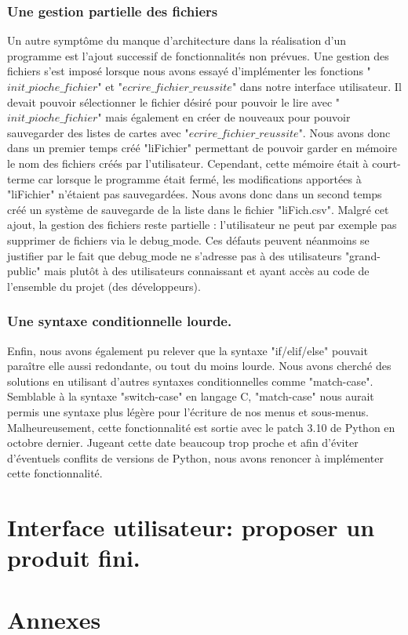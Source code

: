 \documentclass[10pt,a4paper,french,titlepage]{article}
\theoremstyle{definition}
\begin{document}
\subsubsection{Une gestion partielle des fichiers}
Un autre symptôme du manque d'architecture dans la réalisation d'un programme est l'ajout successif de fonctionnalités non prévues. Une gestion des fichiers s'est imposé lorsque nous avons essayé d'implémenter les fonctions "$init\_pioche\_fichier$" et "$ecrire\_fichier\_reussite$" dans notre interface utilisateur. Il devait pouvoir sélectionner le fichier désiré pour pouvoir le lire avec "$init\_pioche\_fichier$" mais également en créer de nouveaux pour pouvoir sauvegarder des listes de cartes avec "$ecrire\_fichier\_reussite$". Nous avons donc dans un premier temps créé "liFichier" permettant de pouvoir garder en mémoire le nom des fichiers créés par l'utilisateur. Cependant, cette mémoire était à court-terme car lorsque le programme était fermé, les modifications apportées à "liFichier" n'étaient pas sauvegardées. Nous avons donc dans un second temps créé un système de sauvegarde de la liste dans le fichier "liFich.csv". Malgré cet ajout, la gestion des fichiers reste partielle : l'utilisateur ne peut par exemple pas supprimer de fichiers via le debug$\_$mode. Ces défauts peuvent néanmoins se justifier par le fait que debug$\_$mode ne s'adresse pas à des utilisateurs "grand-public" mais plutôt à des utilisateurs connaissant et ayant accès au code de l'ensemble du projet (des développeurs).
\subsubsection{Une syntaxe conditionnelle lourde.}
Enfin, nous avons également pu relever que la syntaxe "if/elif/else" pouvait paraître elle aussi redondante, ou tout du moins lourde. Nous avons cherché des solutions en utilisant d'autres syntaxes conditionnelles comme "match-case". Semblable à la syntaxe "switch-case" en langage C, "match-case" nous aurait permis une syntaxe plus légère pour l'écriture de nos menus et sous-menus. Malheureusement, cette fonctionnalité est sortie avec le patch 3.10 de Python en octobre dernier. Jugeant cette date beaucoup trop proche et afin d'éviter d'éventuels conflits de versions de Python, nous avons renoncer à implémenter cette fonctionnalité.
\section{Interface utilisateur: proposer un produit fini.}
\section{Annexes}
\end{document}
